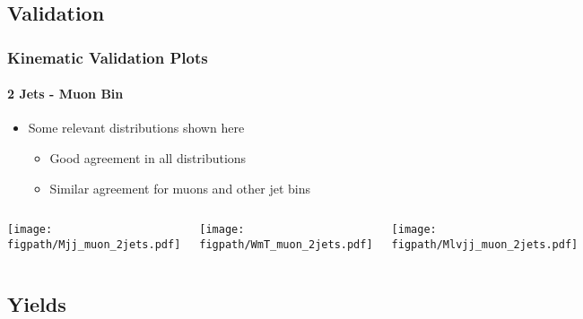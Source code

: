 
\subsection*{Validation}


\begin{frame}
	\frametitle{Kinematic Validation Plots}
	\framesubtitle{2 Jets - Muon Bin}
	\begin{block}{}
		\begin{itemize}
			\item Some relevant distributions shown here
			\begin{itemize}
			 	\item Good agreement in all distributions
			 	\item Similar agreement for muons and other jet bins 
			 \end{itemize}
		\end{itemize}
	\end{block}
	\vspace*{-0.24cm}
	\begin{columns}[T]
			\begin{block}{\scriptsize \Mjj}
				\texttt{[image: \\figpath/Mjj\_muon\_2jets.pdf]}%
			\end{block}
			\begin{block}{\scriptsize \Mlv}
				\texttt{[image: \\figpath/WmT\_muon\_2jets.pdf]}%
			\end{block}
			\begin{block}{\scriptsize \Mlvjj}
				\texttt{[image: \\figpath/Mlvjj\_muon\_2jets.pdf]}%
			\end{block}
	\end{columns}
\end{frame}


\subsection*{Yields}


